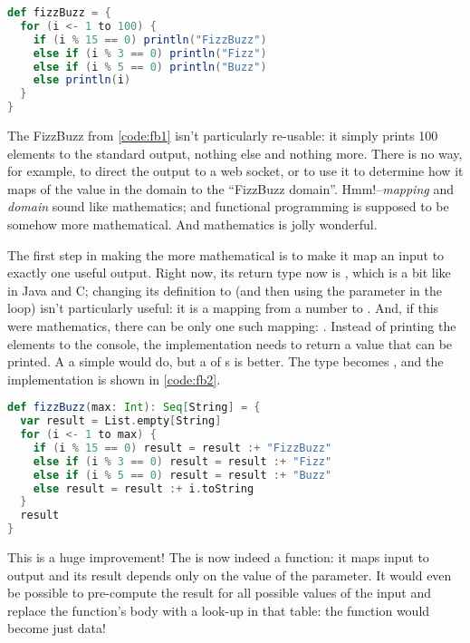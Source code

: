 \documentclass[10 pt]{article}
\begin{document}
\begin{lstlisting}[caption={Fizz Buzz}, label={code:fb1}, language=Scala, escapechar=|]
def fizzBuzz = {
  for (i <- 1 to 100) {
    if (i % 15 == 0) println("FizzBuzz")
    else if (i % 3 == 0) println("Fizz")
    else if (i % 5 == 0) println("Buzz")
    else println(i)
  }
}
\end{lstlisting}

The FizzBuzz from \autoref{code:fb1} isn't particularly re-usable: it simply prints 100 elements to the standard output, nothing else and nothing more. There is no way, for example, to direct the output to a web socket, or to use it to determine how it maps of the value in the  domain to the ``FizzBuzz domain''. Hmm!--\emph{mapping} and \emph{domain} sound like mathematics; and functional programming is supposed to be somehow more mathematical. And mathematics is jolly wonderful. 

The first step in making the  more mathematical is to make it map an input to exactly one useful output. Right now, its return type now is , which is a bit like  in Java and C; changing its definition to  (and then using the  parameter in the loop) isn't particularly useful: it is a mapping from a number to . And, if this were mathematics, there can be only one such mapping: . Instead of printing the elements to the console, the implementation needs to return a value that can be printed. A a simple  would do, but a  of s is better. The type becomes , and the implementation is shown in \autoref{code:fb2}.

\begin{lstlisting}[caption={Fizz Buzz}, label={code:fb2}, language=Scala, escapechar=|]
def fizzBuzz(max: Int): Seq[String] = {
  var result = List.empty[String]
  for (i <- 1 to max) {
    if (i % 15 == 0) result = result :+ "FizzBuzz"
    else if (i % 3 == 0) result = result :+ "Fizz"
    else if (i % 5 == 0) result = result :+ "Buzz"
    else result = result :+ i.toString
  }
  result
}
\end{lstlisting}

This is a huge improvement! The  is now indeed a function: it maps input to output and its result depends only on the value of the parameter. It would even be possible to pre-compute the result for all possible values of the input and replace the function's body with a look-up in that table: the function would become just data! 
\end{document}
